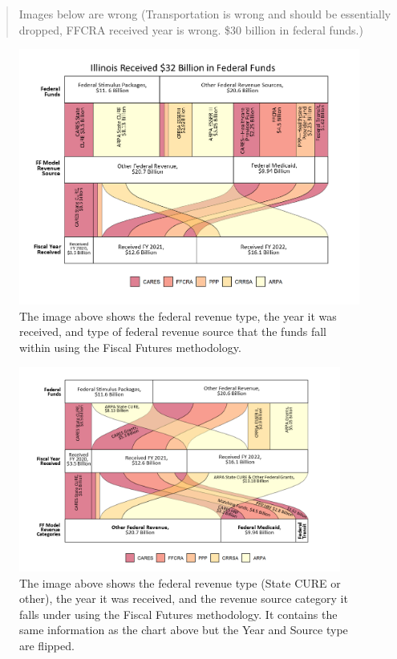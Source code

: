 \documentclass[
  letterpaper,
  DIV=11,
  numbers=noendperiod]{scrreport}
\begin{document}
\begin{quote}
Images below are wrong (Transportation is wrong and should be
essentially dropped, FFCRA received year is wrong. \$30 billion in
federal funds.)
\end{quote}

\begin{figure}

{\centering \includegraphics[width=4.83333in,height=\textheight]{./images/revenues_ioc_32bil_byyear-02.png}

}

\caption{\label{fig-ioc_received_32bil_byyear}The image above shows the
federal revenue type, the year it was received, and type of federal
revenue source that the funds fall within using the Fiscal Futures
methodology.}

\end{figure}

\begin{figure}

{\centering \includegraphics[width=4.16667in,height=\textheight]{./images/revenues_ioc_32bil_byrevsource.png}

}

\caption{\label{fig-received-ioc32bil-byrevsource}The image above shows
the federal revenue type (State CURE or other), the year it was
received, and the revenue source category it falls under using the
Fiscal Futures methodology. It contains the same information as the
chart above but the Year and Source type are flipped.}

\end{figure}
\end{document}
